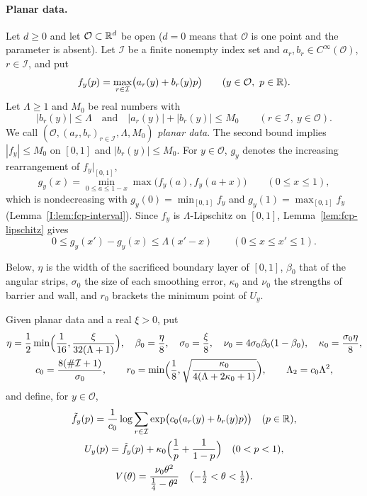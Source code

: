\paragraph{Planar data.} Let $d\ge0$ and let $\mathcal O\subset\mathbb{R}^d$ be open ($d=0$ means that $\mathcal O$ is one point
and the parameter is absent). Let $\mathcal I$ be a finite nonempty index set and $a_r,b_r\in C^\infty(\mathcal O)$,
$r\in\mathcal I$, and put
\begin{equation}\label{eq:plc-f}
 f_y(p)=\max_{r\in\mathcal I}\bigl(a_r(y)+b_r(y)p\bigr)\qquad(y\in\mathcal O,\ p\in\mathbb{R}).
\end{equation}
Let $\Lambda\ge1$ and $M_0$ be real numbers with
\[
 |b_r(y)|\le\Lambda\quad\text{and}\quad|a_r(y)|+|b_r(y)|\le M_0\qquad(r\in\mathcal I,\ y\in\mathcal O).
\]
We call $(\mathcal O,(a_r,b_r)_{r\in\mathcal I},\Lambda,M_0)$ \emph{planar data}. The second bound implies $|f_y|\le M_0$ on $[0,1]$ and $|b_r(y)|\le M_0$. For $y\in\mathcal O$, $g_y$ denotes the increasing
rearrangement of $f_y|_{[0,1]}$,
\[
 g_y(x)=\min_{0\le a\le1-x}\max\bigl(f_y(a),f_y(a+x)\bigr)\qquad(0\le x\le1),
\]
which is nondecreasing with $g_y(0)=\min_{[0,1]}f_y$ and $g_y(1)=\max_{[0,1]}f_y$ (Lemma~\ref{I:lem:fcp-interval}). Since $f_y$
is $\Lambda$-Lipschitz on $[0,1]$, Lemma~\ref{lem:fcp-lipschitz} gives
\begin{equation}\label{eq:plc-glip}
 0\le g_y(x')-g_y(x)\le\Lambda(x'-x)\qquad(0\le x\le x'\le1).
\end{equation}

Below, $\eta$ is the width of the sacrificed boundary layer of $[0,1]$, $\beta_0$ that of the angular strips, $\sigma_0$
the size of each smoothing error, $\kappa_0$ and $\nu_0$ the strengths of barrier and wall, and $r_0$ brackets the
minimum point of $U_y$.

\begin{definition}\label{def:plc-constants}
Given planar data and a real $\xi>0$, put
\begin{gather*}
 \eta=\frac12\min\Bigl(\frac1{16},\frac{\xi}{32(\Lambda+1)}\Bigr),\quad \beta_0=\frac\eta8,\quad \sigma_0=\frac\xi8,\quad
 \nu_0=4\sigma_0\beta_0(1-\beta_0),\quad \kappa_0=\frac{\sigma_0\eta}8,\\
 c_0=\frac{8(\#\mathcal I+1)}{\sigma_0},\qquad r_0=\min\Bigl(\frac18,\sqrt{\frac{\kappa_0}{4(\Lambda+2\kappa_0+1)}}\Bigr),\qquad
 \Lambda_2=c_0\Lambda^2,
\end{gather*}
and define, for $y\in\mathcal O$,
\begin{gather*}
 \tilde f_y(p)=\frac1{c_0}\log\sum_{r\in\mathcal I}\exp\bigl(c_0(a_r(y)+b_r(y)p)\bigr)\quad(p\in\mathbb{R}),\\
 U_y(p)=\tilde f_y(p)+\kappa_0\Bigl(\frac1p+\frac1{1-p}\Bigr)\quad(0<p<1),\\
 V(\theta)=\frac{\nu_0\theta^2}{\frac14-\theta^2}\quad\bigl(-\tfrac12<\theta<\tfrac12\bigr).
\end{gather*}
\end{definition}

